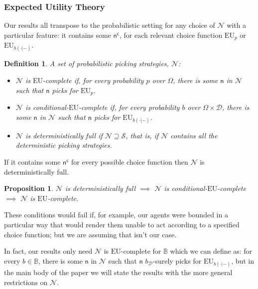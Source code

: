 \documentclass[a4paper,final]{article}
\newtheorem{definition}[theorem]{Definition}
\newtheorem{proposition}[theorem]{Proposition}
\newcommand\EU{\mathrm{EU}}
\newcommand{\Decs}{\mathcal{D}}
\renewcommand\S{\mathcal{S}}
\renewcommand\c{\mathsf{c}} %
\newcommand{\n}{\mathsf{n}}
\renewcommand{\nu}{\n}
\newcommand\Nu{\mathcal{N}}
\newcommand{\IB}{\mathbb{B}}
\renewcommand{\color}[1]{}
\newenvironment{colored}[1]{\leavevmode\color{#1}}{}
\newenvironment{CCM rewritten}
{\begingroup\color{blue}} %
{\endgroup}              %
\begin{document}
\subsubsection{Expected Utility Theory}

Our results all transpose to the probabilistic setting for any choice of $\Nu$ with a particular feature: it contains some $\nu^\c$, for each relevant choice function $\EU_p$ or $\EU_{b(\cdot|-)}$.
\begin{definition}\label{def:EU-complete}
	A set of probabilistic picking strategies, $\Nu$:
	
	\begin{itemize}
		\item $\Nu$ is \emph{$\EU$-complete} if, for every probability $p$ over $\Omega$, there is some $\n$ in $\Nu$ such that $\n$ picks for $\EU_p$.
	
	\item $\Nu$ is \emph{conditional-$\EU$-complete} if, for every probability $b$ over $\Omega\times\Decs$, there is some $\n$ in $\Nu$ such that $\n$ picks for $\EU_{b(\cdot|-)}$.

		
	\item $\Nu$ is \emph{deterministically full} if $\Nu\supseteq\S$, that is, if $\Nu$  contains all the deterministic picking strategies. 
	\end{itemize}

		

\end{definition}
If it contains some $\nu^\c$ for every possible choice function then $\Nu$ is deterministically full. 
\begin{proposition}\label{thm:EU-complete}
 $\Nu$ is deterministically full
		$\implies$  $\Nu$ is  conditional-$\EU$-complete 
		$\implies$  $\Nu$ is  $\EU$-complete.
\end{proposition}

These conditions would fail if, for example, our agents were bounded in a particular way that would render them unable to act according to a specified choice function; but we are assuming that isn't our case. 

In fact, our results only need 	$\Nu$ is {$\EU$-complete for $\IB$} which we can define as: for every  $b\in \IB$, there is some $\n$ in $\Nu$ such that $\n$ $b_\Decs$-surely picks for $\EU_{b(\cdot|-)}$,  but in the main body of the paper we will state the results with the more general restrictions on $\Nu$.
	
\end{document}

